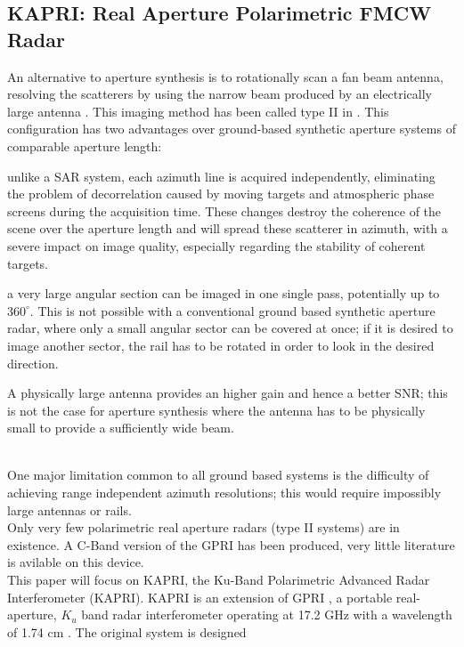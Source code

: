 \subsection{KAPRI: Real Aperture Polarimetric FMCW Radar}
An alternative to aperture synthesis is to rotationally scan a fan beam antenna, resolving the scatterers by using the narrow beam produced by an electrically large antenna \cite{Werner2008}. This imaging method has been called type II in \cite{Caduff2015}. 
This configuration has two advantages over ground-based synthetic aperture systems\cite{Monserrat2014} of comparable aperture length: \begin{enumerate*}
  \item unlike a SAR system, each azimuth line is 
acquired independently, eliminating the problem of decorrelation caused by moving targets and atmospheric phase screens during the acquisition time. 
These changes destroy the coherence of the scene over the aperture length and will spread these scatterer in azimuth, with a severe impact on image quality, especially regarding the stability of coherent targets.\\ \item a very large 
angular section can be imaged in one single pass, potentially up to $360^{\circ}$. This is not possible with a conventional ground based synthetic aperture radar, where only a small angular sector
can be covered at once; if it is desired to image another sector, the rail has to be rotated in order to look in the desired direction.\\
\item A physically large antenna provides an higher gain and hence a better SNR; this is not the case for  aperture synthesis  where the antenna has to be physically small to provide a sufficiently wide beam.\\
\end{enumerate*}\\
One major limitation common to all ground based systems is the difficulty of achieving range independent azimuth resolutions; this would require impossibly large antennas or rails.\\
Only very few polarimetric real aperture radars (type II systems) are in existence. A C-Band version of the GPRI has been produced\cite{Cherukumilli2012}, very little literature is avilable on this device.\\ This paper will focus on KAPRI, the Ku-Band Polarimetric Advanced Radar Interferometer (KAPRI). KAPRI is an extension of GPRI \cite{werner_gpri_2012,Strozzi2011, Werner2008}, a portable real-aperture, $K_u$ band radar interferometer operating at 17.2 GHz with a wavelength of 1.74 cm . The original system is designed 

